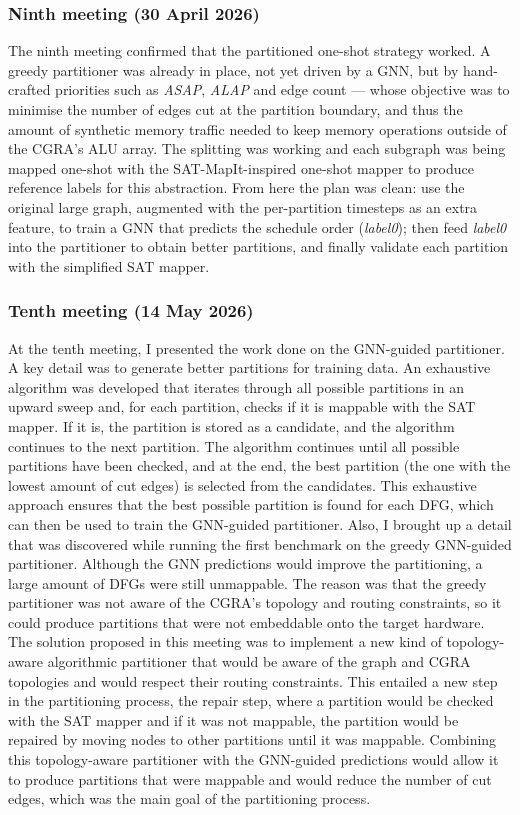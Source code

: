 \documentclass[10pt]{article}
\begin{document}
\subsubsection{Ninth meeting (30 April 2026)}

The ninth meeting confirmed that the partitioned one-shot strategy
worked. A greedy partitioner was already in place, not yet driven by a
GNN, but by hand-crafted priorities such as \textit{ASAP}, \textit{ALAP} and edge count —
whose objective was to minimise the number of edges cut at the
partition boundary, and thus the amount of synthetic memory traffic
needed to keep memory operations outside of the CGRA's ALU array. The
splitting was working and each subgraph was being mapped one-shot with
the SAT-MapIt-inspired one-shot mapper to produce reference labels for
this abstraction. From here the plan was
clean: use the original large graph, augmented with the per-partition
timesteps as an extra feature, to train a GNN that predicts the
schedule order (\textit{label0}); then feed \textit{label0} into the
partitioner to obtain better partitions, and finally validate each
partition with the simplified SAT mapper.

\subsubsection{Tenth meeting (14 May 2026)}
At the tenth meeting, I presented the work done on the GNN-guided partitioner. A key detail was to generate better partitions for training data. An exhaustive algorithm was developed that iterates through all possible partitions in an upward sweep and, for each partition, checks if it is mappable with the SAT mapper. If it is, the partition is stored as a candidate, and the algorithm continues to the next partition. The algorithm continues until all possible partitions have been checked, and at the end, the best partition (the one with the lowest amount of cut edges) is selected from the candidates. This exhaustive approach ensures that the best possible partition is found for each DFG, which can then be used to train the GNN-guided partitioner.
Also, I brought up a detail that was discovered while running the first benchmark on the greedy GNN-guided partitioner. Although the GNN predictions would improve the partitioning, a large amount of DFGs were still unmappable. The reason was that the greedy partitioner was not aware of the CGRA's topology and routing constraints, so it could produce partitions that were not embeddable onto the target hardware. The solution proposed in this meeting was to implement a new kind of topology-aware algorithmic partitioner that would be aware of the graph and CGRA topologies and would respect their routing constraints. This entailed a new step in the partitioning process, the repair step, where a partition would be checked with the SAT mapper and if it was not mappable, the partition would be repaired by moving nodes to other partitions until it was mappable. Combining this topology-aware partitioner with the GNN-guided predictions would allow it to produce partitions that were mappable and would reduce the number of cut edges, which was the main goal of the partitioning process.
\end{document}
